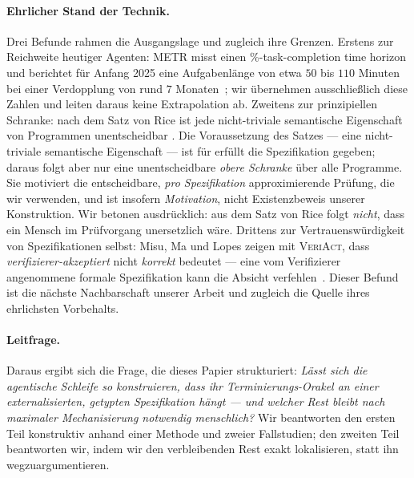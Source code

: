 \documentclass[11pt,a4paper]{article}
\theoremstyle{definition}
\theoremstyle{remark}
\begin{document}
\paragraph{Ehrlicher Stand der Technik.}
Drei Befunde rahmen die Ausgangslage und zugleich ihre Grenzen. Erstens zur Reichweite
heutiger Agenten: METR misst einen \%-task-completion time horizon\grqq{} und berichtet
für Anfang 2025 eine Aufgabenlänge von etwa $50$ bis $110$ Minuten bei einer Verdopplung
von rund $7$ Monaten~\cite{metr2025}; wir übernehmen ausschließlich diese Zahlen und leiten
daraus keine Extrapolation ab. Zweitens zur prinzipiellen Schranke: nach dem Satz von
Rice ist jede nicht-triviale semantische Eigenschaft von Programmen unentscheidbar
\cite{rice1953}. Die Voraussetzung des Satzes --- eine nicht-triviale semantische
Eigenschaft --- ist für \glqq erfüllt die Spezifikation\grqq{} gegeben; daraus folgt aber nur eine
unentscheidbare \emph{obere Schranke} über alle Programme. Sie motiviert die entscheidbare,
\emph{pro Spezifikation} approximierende Prüfung, die wir verwenden, und ist insofern
\emph{Motivation}, nicht Existenzbeweis unserer Konstruktion. Wir betonen ausdrücklich: aus dem
Satz von Rice folgt \emph{nicht}, dass ein Mensch im Prüfvorgang unersetzlich wäre. Drittens
zur Vertrauenswürdigkeit von Spezifikationen selbst: Misu, Ma und Lopes zeigen mit
\textsc{VeriAct}, dass \emph{verifizierer-akzeptiert} nicht \emph{korrekt} bedeutet --- eine vom
Verifizierer angenommene formale Spezifikation kann die Absicht verfehlen~\cite{veriact2026}.
Dieser Befund ist die nächste Nachbarschaft unserer Arbeit und zugleich die Quelle ihres
ehrlichsten Vorbehalts.

\paragraph{Leitfrage.}
Daraus ergibt sich die Frage, die dieses Papier strukturiert: \emph{Lässt sich die
agentische Schleife so konstruieren, dass ihr Terminierungs-Orakel an einer
externalisierten, getypten Spezifikation hängt --- und welcher Rest bleibt nach maximaler
Mechanisierung notwendig menschlich?} Wir beantworten den ersten Teil konstruktiv anhand
einer Methode und zweier Fallstudien; den zweiten Teil beantworten wir, indem wir den
verbleibenden Rest exakt lokalisieren, statt ihn wegzuargumentieren.
\end{document}
